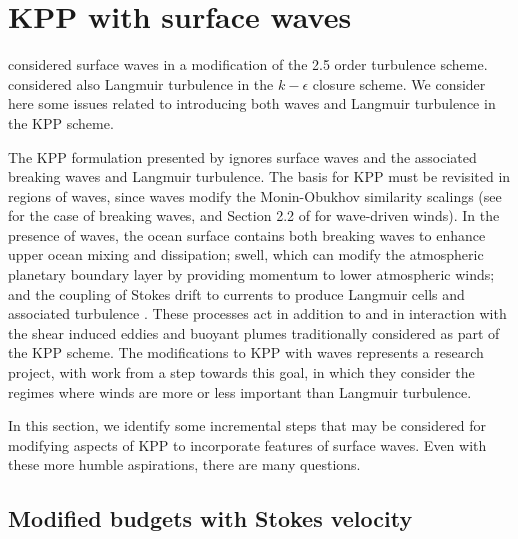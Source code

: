 \section{KPP with surface waves}
\label{section:surface-waves-and-kpp}

\cite{Craig_Banner_1994} considered surface waves in a modification of
the \cite{MellorYamada1982} 2.5 order turbulence scheme.
\cite{Axell_2002} considered also Langmuir turbulence in the
$k-\epsilon$ closure scheme.  We consider here some issues related to
introducing both waves and Langmuir turbulence in the KPP scheme.

The KPP formulation presented by \cite{LargeKPP} ignores surface waves
and the associated breaking waves and Langmuir turbulence.  The basis
for KPP must be revisited in regions of waves, since waves modify the
Monin-Obukhov similarity scalings (see \cite{Terray_etal1996} for the
case of breaking waves, and Section 2.2 of
\cite{SullivanMcWilliams2010} for wave-driven winds).  In the presence
of waves, the ocean surface contains both breaking waves to enhance
upper ocean mixing and dissipation; swell, which can modify the
atmospheric planetary boundary layer by providing momentum to lower
atmospheric winds; and the coupling of Stokes drift to currents to
produce Langmuir cells and associated turbulence
\citep{McWilliams_etal1997}.  These processes act in addition to and
in interaction with the shear induced eddies and buoyant plumes
traditionally considered as part of the KPP scheme.  The modifications
to KPP with waves represents a research project, with work from
\cite{Belcher_etal2012} a step towards this goal, in which they
consider the regimes where winds are more or less important than
Langmuir turbulence.

In this section, we identify some incremental steps that may be
considered for modifying aspects of KPP to incorporate features of
surface waves.  Even with these more humble aspirations, there are
many questions.


\subsection{Modified budgets with Stokes velocity}
\label{subsection:stokes-into-pe-kpp}

